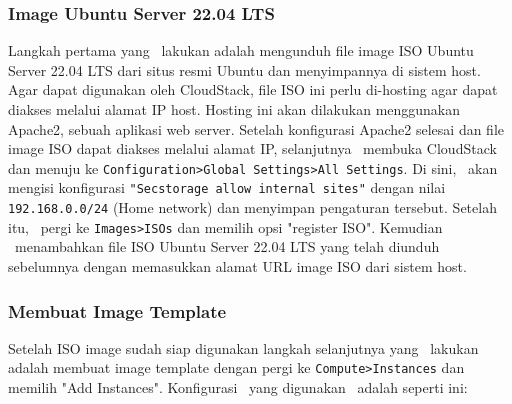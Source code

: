 \subsubsection{Image Ubuntu Server 22.04 LTS}
Langkah pertama yang \saya\ lakukan adalah mengunduh file image ISO Ubuntu Server 22.04 LTS dari situs resmi Ubuntu dan menyimpannya di sistem host. Agar dapat digunakan oleh CloudStack, file ISO ini perlu di-hosting agar dapat diakses melalui alamat IP host. Hosting ini akan dilakukan menggunakan Apache2, sebuah aplikasi web server. Setelah konfigurasi Apache2 selesai dan file image ISO dapat diakses melalui alamat IP, selanjutnya \saya\ membuka CloudStack dan menuju ke \texttt{Configuration>Global Settings>All Settings}. Di sini, \saya\ akan mengisi konfigurasi \texttt{"Secstorage allow internal sites"} dengan nilai \texttt{192.168.0.0/24} (Home network) dan menyimpan pengaturan tersebut. Setelah itu, \saya\ pergi ke \texttt{Images>ISOs} dan memilih opsi "register ISO". Kemudian \saya\ menambahkan file ISO Ubuntu Server 22.04 LTS yang telah diunduh sebelumnya dengan memasukkan alamat URL image ISO dari sistem host.

\subsubsection{Membuat Image Template}
Setelah ISO image sudah siap digunakan langkah selanjutnya yang \saya\ lakukan adalah membuat image template dengan pergi ke \texttt{Compute>Instances} dan memilih "Add Instances". Konfigurasi \vm\ yang digunakan \saya\ adalah seperti ini:


